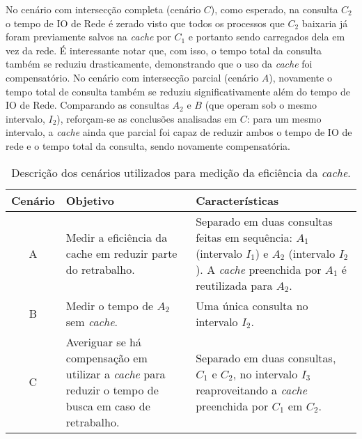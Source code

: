 No cenário com intersecção completa (cenário $C$), como esperado, na consulta
$C_2$ o tempo de IO de Rede é zerado visto que todos os processos que $C_2$
baixaria já foram previamente salvos na \textit{cache} por $C_1$ e portanto
sendo carregados dela em vez da rede. É interessante notar que, com isso, o
tempo total da consulta também se reduziu drasticamente, demonstrando que o uso
da \textit{cache} foi compensatório. No cenário com intersecção parcial
(cenário $A$), novamente o tempo total de consulta também se reduziu
significativamente além do tempo de IO de Rede. Comparando as consultas $A_2$ e
$B$ (que operam sob o mesmo intervalo, $I_2$), reforçam-se as conclusões
analisadas em $C$: para um mesmo intervalo, a \textit{cache} ainda que parcial
foi capaz de reduzir ambos o tempo de IO de rede e o tempo total da consulta,
sendo novamente compensatória.

\begin{table}[htb]
  \begin{tabular}{cp{}p{}}
    \toprule
    Cenário & Objetivo & Características \\
    \midrule
    A
    &
    Medir a eficiência da cache em reduzir parte do retrabalho.
    &
    Separado em duas consultas feitas em sequência: $A_1$ (intervalo $I_1$) e
    $A_2$ (intervalo $I_2$). A \textit{cache} preenchida por $A_1$ é
    reutilizada para $A_2$.
    \\
    B & Medir o tempo de $A_2$ sem \textit{cache}. & Uma única consulta no intervalo $I_2$.
    \\
    C
    &
    Averiguar se há compensação em utilizar a \textit{cache} para reduzir o
    tempo de busca em caso de retrabalho.
    &
    Separado em duas consultas, $C_1$ e $C_2$, no intervalo $I_3$
    reaproveitando a \textit{cache} preenchida por $C_1$ em $C_2$.
    \\
    \bottomrule
  \end{tabular}
  \caption{Descrição dos cenários utilizados para medição da eficiência da \textit{cache}.}
  \label{tab:descrição-cenários-cache}
\end{table}

